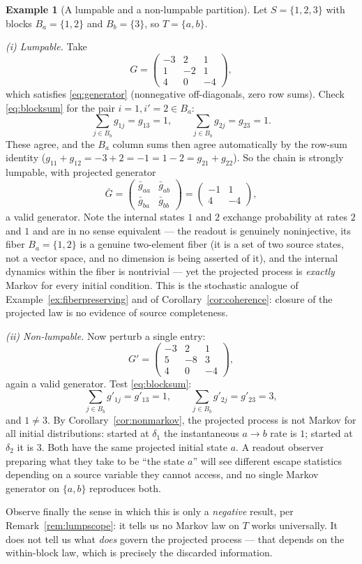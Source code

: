 \documentclass[11pt,reqno]{amsart}
\theoremstyle{plain}
\theoremstyle{definition}
\newtheorem{example}[theorem]{Example}
\theoremstyle{remark}
\begin{document}
\begin{example}[A lumpable and a non-lumpable partition]\label{ex:lumpability}
Let $S=\{1,2,3\}$ with blocks $B_a=\{1,2\}$ and $B_b=\{3\}$, so $T=\{a,b\}$.

\emph{(i) Lumpable.} Take
\[
G=\begin{pmatrix} -3 & 2 & 1\\ 1 & -2 & 1\\ 4 & 0 & -4\end{pmatrix},
\]
which satisfies \eqref{eq:generator} (nonnegative off-diagonals, zero row sums). Check \eqref{eq:blocksum} for the pair $i=1,i'=2\in B_a$:
\[
\sum_{j\in B_b}g_{1j}=g_{13}=1,\qquad \sum_{j\in B_b}g_{2j}=g_{23}=1 .
\]
These agree, and the $B_a$ column sums then agree automatically by the row-sum identity ($g_{11}+g_{12}=-3+2=-1=1-2=g_{21}+g_{22}$). So the chain is strongly lumpable, with projected generator
\[
\bar G=\begin{pmatrix}\bar g_{aa} & \bar g_{ab}\\ \bar g_{ba} & \bar g_{bb}\end{pmatrix}
=\begin{pmatrix}-1 & 1\\ 4 & -4\end{pmatrix},
\]
a valid generator. Note the internal states $1$ and $2$ exchange probability at rates $2$ and $1$ and are in no sense equivalent --- the readout is genuinely noninjective, its fiber $B_a=\{1,2\}$ is a genuine two-element fiber (it is a set of two source states, not a vector space, and no dimension is being asserted of it), and the internal dynamics within the fiber is nontrivial --- yet the projected process is \emph{exactly} Markov for every initial condition. This is the stochastic analogue of Example~\ref{ex:fiberpreserving} and of Corollary~\ref{cor:coherence}: closure of the projected law is no evidence of source completeness.

\emph{(ii) Non-lumpable.} Now perturb a single entry:
\[
G'=\begin{pmatrix} -3 & 2 & 1\\ 5 & -8 & 3\\ 4 & 0 & -4\end{pmatrix},
\]
again a valid generator. Test \eqref{eq:blocksum}:
\[
\sum_{j\in B_b}g'_{1j}=g'_{13}=1,\qquad \sum_{j\in B_b}g'_{2j}=g'_{23}=3,
\]
and $1\neq3$. By Corollary~\ref{cor:nonmarkov}, the projected process is not Markov for all initial distributions: started at $\delta_1$ the instantaneous $a\to b$ rate is $1$; started at $\delta_2$ it is $3$. Both have the same projected initial state $a$. A readout observer preparing what they take to be ``the state $a$'' will see different escape statistics depending on a source variable they cannot access, and no single Markov generator on $\{a,b\}$ reproduces both.

Observe finally the sense in which this is only a \emph{negative} result, per Remark~\ref{rem:lumpscope}: it tells us no Markov law on $T$ works universally. It does not tell us what \emph{does} govern the projected process --- that depends on the within-block law, which is precisely the discarded information.
\end{example}
\end{document}
